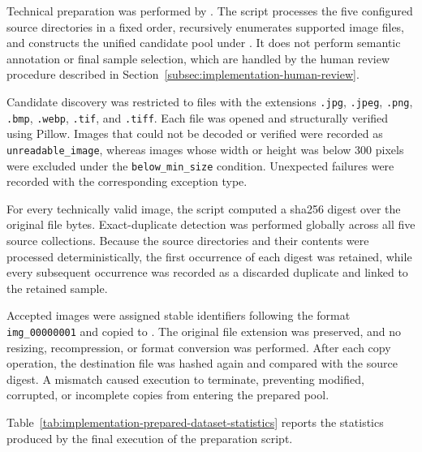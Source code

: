 Technical preparation was performed by
. The script
processes the five configured source directories in a fixed order, recursively
enumerates supported image files, and constructs the unified candidate pool
under . It does not perform semantic
annotation or final sample selection, which are handled by the human review
procedure described in
Section~\ref{subsec:implementation-human-review}.

Candidate discovery was restricted to files with the extensions
\texttt{.jpg}, \texttt{.jpeg}, \texttt{.png}, \texttt{.bmp},
\texttt{.webp}, \texttt{.tif}, and \texttt{.tiff}. Each file was opened and
structurally verified using Pillow. Images that could not be decoded or
verified were recorded as \texttt{unreadable\_image}, whereas images whose
width or height was below 300 pixels were excluded under the
\texttt{below\_min\_size} condition. Unexpected failures were recorded with
the corresponding exception type.

For every technically valid image, the script computed a \gls{sha256} digest
over the original file bytes. Exact-duplicate detection was performed globally
across all five source collections. Because the source directories and their
contents were processed deterministically, the first occurrence of each digest
was retained, while every subsequent occurrence was recorded as a discarded
duplicate and linked to the retained sample.

Accepted images were assigned stable identifiers following the format
\texttt{img\_00000001} and copied to
. The original file extension
was preserved, and no resizing, recompression, or format conversion was
performed. After each copy operation, the destination file was hashed again and
compared with the source digest. A mismatch caused execution to terminate,
preventing modified, corrupted, or incomplete copies from entering the prepared
pool.

Table~\ref{tab:implementation-prepared-dataset-statistics} reports the
statistics produced by the final execution of the preparation script.

